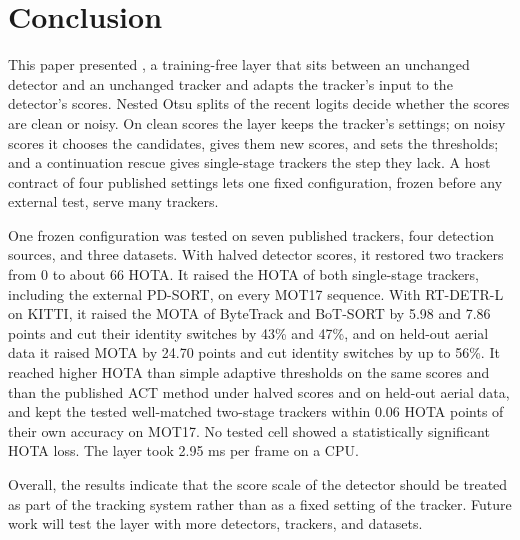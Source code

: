 \section{Conclusion}\label{sec:conclusion}

This paper presented \scl{}, a training-free layer that sits between an unchanged detector and an
unchanged tracker and adapts the tracker's input to the detector's scores. Nested Otsu splits of the recent logits decide
whether the scores are clean or noisy. On clean scores the layer keeps the tracker's settings; on
noisy scores it chooses the candidates, gives them new scores, and sets the thresholds; and a
continuation rescue gives single-stage trackers the step they lack. A host contract of four
published settings lets one fixed configuration, frozen before any external test, serve many
trackers.

One frozen configuration was tested on seven published trackers, four detection sources, and three
datasets. With halved detector scores, it restored two trackers from 0 to about 66 HOTA. It raised
the HOTA of both single-stage trackers, including the external PD-SORT, on every MOT17 sequence.
With RT-DETR-L on KITTI, it raised the MOTA of ByteTrack and BoT-SORT by 5.98 and 7.86 points and
cut their identity switches by 43\% and 47\%, and on held-out aerial data it raised MOTA by 24.70
points and cut identity switches by up to 56\%. It reached higher HOTA than simple adaptive
thresholds on the same scores and than the published ACT method under halved scores and on
held-out aerial data, and kept the tested well-matched two-stage trackers within 0.06 HOTA points
of their own accuracy on MOT17. No tested cell showed a statistically significant HOTA loss. The layer took 2.95 ms per frame on a CPU.

Overall, the results indicate that the score scale of the detector should be treated as part of
the tracking system rather than as a fixed setting of the tracker. Future work will test the layer with
more detectors, trackers, and datasets.

